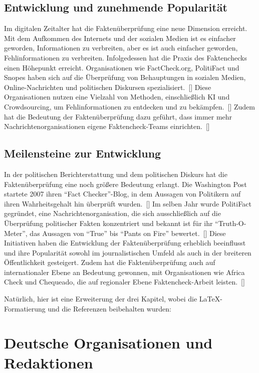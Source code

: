 \documentclass[a4paper,listof=totoc,bibliography=totoc]{scrartcl}
\begin{document}
\subsection{Entwicklung und zunehmende Popularität}

Im digitalen Zeitalter hat die Faktenüberprüfung eine neue Dimension erreicht. Mit dem Aufkommen 
des Internets und der sozialen Medien ist es einfacher geworden, Informationen zu verbreiten, 
aber es ist auch einfacher geworden, Fehlinformationen zu verbreiten. Infolgedessen hat die Praxis 
des Faktenchecks einen Höhepunkt erreicht. Organisationen wie FactCheck.org, PolitiFact und Snopes 
haben sich auf die Überprüfung von Behauptungen in sozialen Medien, Online-Nachrichten und 
politischen Diskursen spezialisiert.~[\cite{nyhan2010,funke2019}] Diese Organisationen nutzen 
eine Vielzahl von Methoden, einschließlich KI und Crowdsourcing, um Fehlinformationen zu entdecken 
und zu bekämpfen.~[\cite{wardle2017}] Zudem hat die Bedeutung der Faktenüberprüfung dazu geführt, 
dass immer mehr Nachrichtenorganisationen eigene Faktencheck-Teams einrichten.~[\cite{graves2018b}]

\subsection{Meilensteine zur Entwicklung}

In der politischen Berichterstattung und dem politischen Diskurs hat die Faktenüberprüfung eine 
noch größere Bedeutung erlangt. Die Washington Post startete 2007 ihren ``Fact Checker''-Blog, 
in dem Aussagen von Politikern auf ihren Wahrheitsgehalt hin überprüft wurden.~[\cite{dobbs2007}] 
Im selben Jahr wurde PolitiFact gegründet, eine Nachrichtenorganisation, die sich ausschließlich 
auf die Überprüfung politischer Fakten konzentriert und bekannt ist für ihr ``Truth-O-Meter'', das 
Aussagen von ``True'' bis ``Pants on Fire'' bewertet.~[\cite{aden2019}] Diese Initiativen haben 
die Entwicklung der Faktenüberprüfung erheblich beeinflusst und ihre Popularität sowohl im 
journalistischen Umfeld als auch in der breiteren Öffentlichkeit gesteigert. Zudem hat die 
Faktenüberprüfung auch auf internationaler Ebene an Bedeutung gewonnen, mit Organisationen wie 
Africa Check und Chequeado, die auf regionaler Ebene Faktencheck-Arbeit leisten.~[\cite{mantzarlis2018}]


Natürlich, hier ist eine Erweiterung der drei Kapitel, wobei die LaTeX-Formatierung und die Referenzen beibehalten wurden:

\section{Deutsche Organisationen und Redaktionen}
\end{document}
